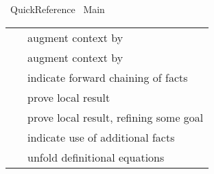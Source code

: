 %
\begin{isabellebody}%
\def\isabellecontext{Quick{\isaliteral{5F}{\isacharunderscore}}Reference}%
%
\isadelimtheory
%
\endisadelimtheory
%
\isatagtheory
{}\isamarkupfalse%
\ Quick{}Reference\isanewline
{}\ Main\isanewline
{}%
\endisatagtheory
{\isafoldtheory}%
%
\isadelimtheory
%
\endisadelimtheory
%
\isamarkuptrue%
%
\isamarkuptrue%
%
\isamarkuptrue%
%
\begin{isamarkuptext}%
\begin{tabular}{ll}
    \hyperlink{command.fix}{\mbox{\isa{\isacommand{fix}}}}~\isa{x} & augment context by \isa{{\isaliteral{22}{\isachardoublequote}}{\isaliteral{5C3C416E643E}{\isasymAnd}}x{\isaliteral{2E}{\isachardot}}\ {\isaliteral{5C3C626F783E}{\isasymbox}}{\isaliteral{22}{\isachardoublequote}}} \\
    \hyperlink{command.assume}{\mbox{\isa{\isacommand{assume}}}}~\isa{{\isaliteral{22}{\isachardoublequote}}a{\isaliteral{3A}{\isacharcolon}}\ {\isaliteral{5C3C7068693E}{\isasymphi}}{\isaliteral{22}{\isachardoublequote}}} & augment context by \isa{{\isaliteral{22}{\isachardoublequote}}{\isaliteral{5C3C7068693E}{\isasymphi}}\ {\isaliteral{5C3C4C6F6E6772696768746172726F773E}{\isasymLongrightarrow}}\ {\isaliteral{5C3C626F783E}{\isasymbox}}{\isaliteral{22}{\isachardoublequote}}} \\
    \hyperlink{command.then}{\mbox{\isa{\isacommand{then}}}} & indicate forward chaining of facts \\
    \hyperlink{command.have}{\mbox{\isa{\isacommand{have}}}}~\isa{{\isaliteral{22}{\isachardoublequote}}a{\isaliteral{3A}{\isacharcolon}}\ {\isaliteral{5C3C7068693E}{\isasymphi}}{\isaliteral{22}{\isachardoublequote}}} & prove local result \\
    \hyperlink{command.show}{\mbox{\isa{\isacommand{show}}}}~\isa{{\isaliteral{22}{\isachardoublequote}}a{\isaliteral{3A}{\isacharcolon}}\ {\isaliteral{5C3C7068693E}{\isasymphi}}{\isaliteral{22}{\isachardoublequote}}} & prove local result, refining some goal \\
    \hyperlink{command.using}{\mbox{\isa{\isacommand{using}}}}~\isa{a} & indicate use of additional facts \\
    \hyperlink{command.unfolding}{\mbox{\isa{\isacommand{unfolding}}}}~\isa{a} & unfold definitional equations \\

\end{tabular}
\end{isamarkuptext}
\end{isabellebody}

